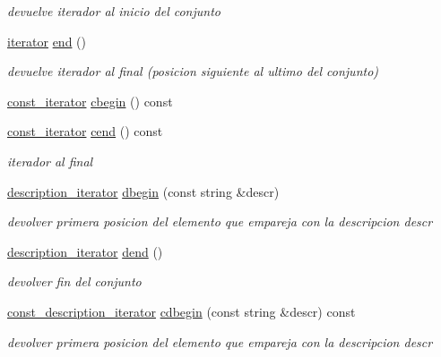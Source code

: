 \begin{DoxyCompactItemize}
\begin{DoxyCompactList}\small\item\em devuelve iterador al inicio del conjunto \end{DoxyCompactList}\item 
\hyperlink{classconjunto_1_1iterator}{iterator} \hyperlink{classconjunto_ad4e8354e39f49e48141eef0d17797292}{end} ()
\begin{DoxyCompactList}\small\item\em devuelve iterador al final (posicion siguiente al ultimo del conjunto) \end{DoxyCompactList}\item 
\hyperlink{classconjunto_1_1const__iterator}{const\-\_\-iterator} \hyperlink{classconjunto_a7933f91ed5906a9545f682572cb687f6}{cbegin} () const 
\item 
\hyperlink{classconjunto_1_1const__iterator}{const\-\_\-iterator} \hyperlink{classconjunto_ab29b3d1855e631625dab94db9af9ee9c}{cend} () const 
\begin{DoxyCompactList}\small\item\em iterador al final \end{DoxyCompactList}\item 
\hyperlink{classconjunto_1_1description__iterator}{description\-\_\-iterator} \hyperlink{classconjunto_acd209e7626973fd13c07da2e51675923}{dbegin} (const string \&descr)
\begin{DoxyCompactList}\small\item\em devolver primera posicion del elemento que empareja con la descripcion descr \end{DoxyCompactList}\item 
\hyperlink{classconjunto_1_1description__iterator}{description\-\_\-iterator} \hyperlink{classconjunto_ade7f369233cc161a33d6136f1a1323fc}{dend} ()
\begin{DoxyCompactList}\small\item\em devolver fin del conjunto \end{DoxyCompactList}\item 
\hyperlink{classconjunto_1_1const__description__iterator}{const\-\_\-description\-\_\-iterator} \hyperlink{classconjunto_ae8b7f92580292f9d2839b7c96186ced3}{cdbegin} (const string \&descr) const 
\begin{DoxyCompactList}\small\item\em devolver primera posicion del elemento que empareja con la descripcion descr \end{DoxyCompactList}\item 

\end{DoxyCompactItemize}
